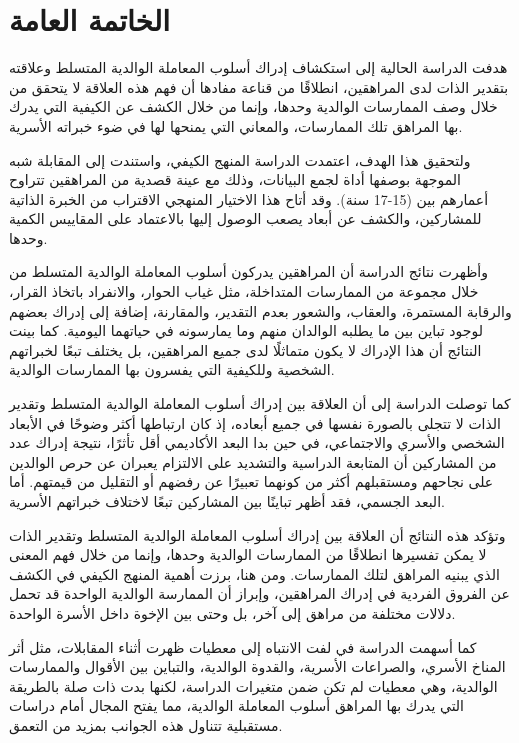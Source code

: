 \documentclass[12pt,oneside]{report}
\begin{document}
\chapter*{الخاتمة العامة}
هدفت الدراسة الحالية إلى استكشاف إدراك أسلوب المعاملة الوالدية المتسلط وعلاقته بتقدير الذات لدى المراهقين، انطلاقًا من قناعة مفادها أن فهم هذه العلاقة لا يتحقق من خلال وصف الممارسات الوالدية وحدها، وإنما من خلال الكشف عن الكيفية التي يدرك بها المراهق تلك الممارسات، والمعاني التي يمنحها لها في ضوء خبراته الأسرية.

ولتحقيق هذا الهدف، اعتمدت الدراسة المنهج الكيفي، واستندت إلى المقابلة شبه الموجهة بوصفها أداة لجمع البيانات، وذلك مع عينة قصدية من المراهقين تتراوح أعمارهم بين (15-17 سنة). وقد أتاح هذا الاختيار المنهجي الاقتراب من الخبرة الذاتية للمشاركين، والكشف عن أبعاد يصعب الوصول إليها بالاعتماد على المقاييس الكمية وحدها.

وأظهرت نتائج الدراسة أن المراهقين يدركون أسلوب المعاملة الوالدية المتسلط من خلال مجموعة من الممارسات المتداخلة، مثل غياب الحوار، والانفراد باتخاذ القرار، والرقابة المستمرة، والعقاب، والشعور بعدم التقدير، والمقارنة، إضافة إلى إدراك بعضهم لوجود تباين بين ما يطلبه الوالدان منهم وما يمارسونه في حياتهما اليومية. كما بينت النتائج أن هذا الإدراك لا يكون متماثلًا لدى جميع المراهقين، بل يختلف تبعًا لخبراتهم الشخصية وللكيفية التي يفسرون بها الممارسات الوالدية.

كما توصلت الدراسة إلى أن العلاقة بين إدراك أسلوب المعاملة الوالدية المتسلط وتقدير الذات لا تتجلى بالصورة نفسها في جميع أبعاده، إذ كان ارتباطها أكثر وضوحًا في الأبعاد الشخصي والأسري والاجتماعي، في حين بدا البعد الأكاديمي أقل تأثرًا، نتيجة إدراك عدد من المشاركين أن المتابعة الدراسية والتشديد على الالتزام يعبران عن حرص الوالدين على نجاحهم ومستقبلهم أكثر من كونهما تعبيرًا عن رفضهم أو التقليل من قيمتهم. أما البعد الجسمي، فقد أظهر تباينًا بين المشاركين تبعًا لاختلاف خبراتهم الأسرية.

وتؤكد هذه النتائج أن العلاقة بين إدراك أسلوب المعاملة الوالدية المتسلط وتقدير الذات لا يمكن تفسيرها انطلاقًا من الممارسات الوالدية وحدها، وإنما من خلال فهم المعنى الذي يبنيه المراهق لتلك الممارسات. ومن هنا، برزت أهمية المنهج الكيفي في الكشف عن الفروق الفردية في إدراك المراهقين، وإبراز أن الممارسة الوالدية الواحدة قد تحمل دلالات مختلفة من مراهق إلى آخر، بل وحتى بين الإخوة داخل الأسرة الواحدة.

كما أسهمت الدراسة في لفت الانتباه إلى معطيات ظهرت أثناء المقابلات، مثل أثر المناخ الأسري، والصراعات الأسرية، والقدوة الوالدية، والتباين بين الأقوال والممارسات الوالدية، وهي معطيات لم تكن ضمن متغيرات الدراسة، لكنها بدت ذات صلة بالطريقة التي يدرك بها المراهق أسلوب المعاملة الوالدية، مما يفتح المجال أمام دراسات مستقبلية تتناول هذه الجوانب بمزيد من التعمق.
\end{document}
